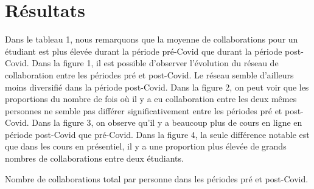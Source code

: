 \documentclass{article}
\begin{document}
\section{Résultats}
Dans le tableau 1, nous remarquons que la moyenne de collaborations pour un étudiant est plus élevée durant la période pré-Covid que durant la période post-Covid. Dans la figure 1, il est possible d'observer l'évolution du réseau de collaboration entre les périodes pré et post-Covid. Le réseau semble d'ailleurs moins diversifié dans la période post-Covid. Dans la figure 2, on peut voir que les proportions du nombre de fois où il y a eu collaboration entre les deux mêmes personnes ne semble pas différer significativement entre les périodes pré et post-Covid. Dans la figure 3, on observe qu'il y a beaucoup plus de cours en ligne en période post-Covid que pré-Covid. Dans la figure 4, la seule différence notable est que dans les cours en présentiel, il y a une proportion plus élevée de grands nombres de collaborations entre deux étudiants.
\clearpage
\begin{table}[h!]
\centering

\caption{Nombre de collaborations total par personne dans les périodes pré et post-Covid.}
\end{table}
\end{document}
